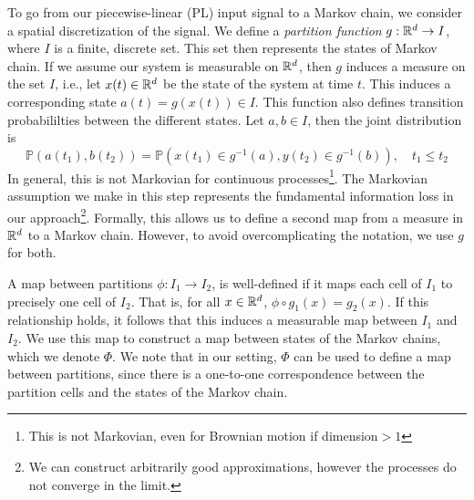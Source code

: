 To go from our piecewise-linear (PL) input signal to a Markov chain, we consider a spatial discretization of the signal.
We define a \emph{partition function} $g:\mathbb{R}^d\rightarrow I$, where $I$ is a finite, discrete set. This set then represents the states of Markov chain. If we assume our system is measurable on $\mathbb{R}^d$, then $g$ induces a measure on the set $I$, i.e., let $x(t)\in \mathbb{R}^d$ be the state of the system at time $t$. This induces a corresponding  state $a(t) = g(x(t)) \in I$. This function also defines transition probabililties between the different states. Let $a,b\in I$, then the joint distribution is
    $$\mathbb{P}(a(t_1),b(t_2)) = \mathbb{P}\left(x(t_1)\in g^{-1}(a), y(t_2) \in g^{-1}(b)\right), 	 \quad t_1\leq t_2$$
 In general, this is not Markovian for continuous processes\footnote{This is not Markovian, even for Brownian motion if dimension$>1$ }. The Markovian assumption we make in this step represents the fundamental information loss in our approach\footnote{We can construct arbitrarily good approximations, however the processes do not converge in the limit.}.
Formally, this allows us to define a second map from a measure in $\mathbb{R}^d$ to a Markov chain. However, to avoid overcomplicating the notation, we use $g$ for both. 

 A map between partitions $\phi: I_1 \rightarrow I_2$, is well-defined if it maps each cell of $I_1$ to precisely one cell of $I_2$. That is, for all $x\in\mathbb{R}^d$, ${\phi\circ g_1(x) =  g_2(x)}$. If this relationship holds, it follows that this induces a measurable map between $I_1$ and $I_2$. We use this map to construct a map between states of the Markov chains, which we denote $\Phi$.  We note that in our setting, $\Phi$ can be used to define a map between partitions, since there is a one-to-one correspondence between the partition cells and the states of the Markov chain.  


